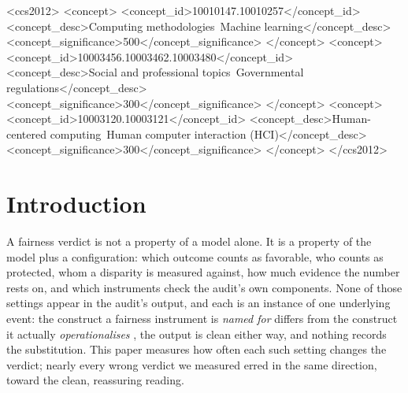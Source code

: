 \documentclass[sigconf,nonacm]{acmart}
\begin{document}
\begin{abstract}
The implication is that a fairness verdict is not a property of the model
alone; it is a property of the model plus an unrecorded configuration. The
same data yield ``worst-treated group at $0.67$,'' ``at $0.90$,''
or ``unknowable,'' depending on choices no reader can see. An audit
should therefore ship its configuration the way results ship error bars. We
close with the six-item record that would accomplish this; every number in
the paper maps to a released artifact that regenerates it.
\end{abstract}

\begin{CCSXML}
<ccs2012>
<concept>
<concept_id>10010147.10010257</concept_id>
<concept_desc>Computing methodologies~Machine learning</concept_desc>
<concept_significance>500</concept_significance>
</concept>
<concept>
<concept_id>10003456.10003462.10003480</concept_id>
<concept_desc>Social and professional topics~Governmental regulations</concept_desc>
<concept_significance>300</concept_significance>
</concept>
<concept>
<concept_id>10003120.10003121</concept_id>
<concept_desc>Human-centered computing~Human computer interaction (HCI)</concept_desc>
<concept_significance>300</concept_significance>
</concept>
</ccs2012>
\end{CCSXML}



\maketitle

\section{Introduction}
\label{sec:intro}

A fairness verdict is not a property of a model alone. It is a property of
the model plus a configuration: which outcome counts as favorable, who
counts as protected, whom a disparity is measured against, how much evidence
the number rests on, and which instruments check the audit's own components.
None of those settings appear in the audit's output, and each is an instance
of one underlying event: the construct a fairness instrument is \emph{named
for} differs from the construct it actually \emph{operationalises}
\citep{jacobswallach2021}, the output is clean either way, and nothing
records the substitution. This paper measures how often each such setting
changes the verdict; nearly every wrong verdict we measured erred in the same
direction, toward the clean, reassuring reading.
\end{document}
